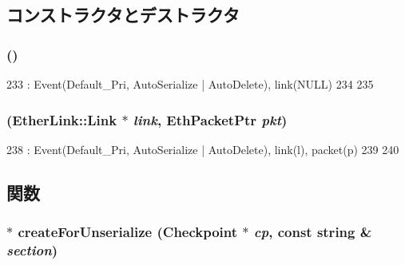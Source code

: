 \subsection{コンストラクタとデストラクタ}
\hypertarget{classLinkDelayEvent_a2400590674c0101699e99de9ce8838b0}{
\subsubsection[{LinkDelayEvent}]{ ()}}
\label{classLinkDelayEvent_a2400590674c0101699e99de9ce8838b0}



\begin{DoxyCode}
233     : Event(Default_Pri, AutoSerialize | AutoDelete), link(NULL)
234 {
235 }
\end{DoxyCode}
\hypertarget{classLinkDelayEvent_ad1183c43a76f885b87e4ba68c8134922}{
\subsubsection[{LinkDelayEvent}]{ ({\bf EtherLink::Link} $\ast$ {\em link}, \/  {\bf EthPacketPtr} {\em pkt})}}
\label{classLinkDelayEvent_ad1183c43a76f885b87e4ba68c8134922}



\begin{DoxyCode}
238     : Event(Default_Pri, AutoSerialize | AutoDelete), link(l), packet(p)
239 {
240 }
\end{DoxyCode}


\subsection{関数}
\hypertarget{classLinkDelayEvent_a6507efe5036b34b31ad311eaf7cd6ba9}{
\subsubsection[{createForUnserialize}]{ $\ast$ createForUnserialize ({\bf Checkpoint} $\ast$ {\em cp}, \/  const string \& {\em section})}}
\label{classLinkDelayEvent_a6507efe5036b34b31ad311eaf7cd6ba9}



